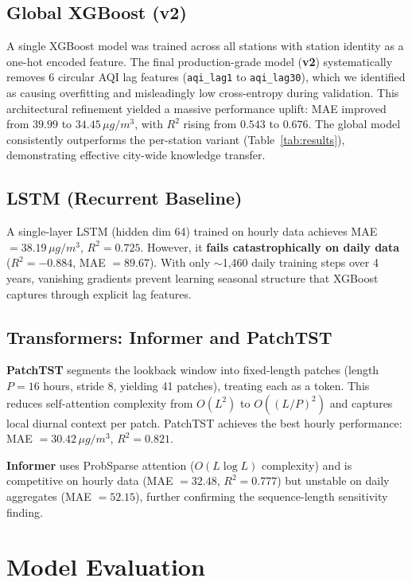 \documentclass[11pt,a4paper]{article}
\begin{document}
\subsection{Global XGBoost (v2)}
A single XGBoost model was trained across all stations with station identity as a one-hot encoded feature. The final production-grade model (\textbf{v2}) systematically removes 6 circular AQI lag features (\texttt{aqi\_lag1} to \texttt{aqi\_lag30}), which we identified as causing overfitting and misleadingly low cross-entropy during validation. This architectural refinement yielded a massive performance uplift: MAE improved from $39.99$ to $\mathbf{34.45}\,\mu g/m^3$, with $R^2$ rising from $0.543$ to $\mathbf{0.676}$. The global model consistently outperforms the per-station variant (Table~\ref{tab:results}), demonstrating effective city-wide knowledge transfer.

\subsection{LSTM (Recurrent Baseline)}
A single-layer LSTM (hidden dim 64) trained on hourly data achieves MAE $= 38.19\,\mu g/m^3$, $R^2 = 0.725$. However, it \textbf{fails catastrophically on daily data} ($R^2 = -0.884$, MAE $= 89.67$). With only $\sim$1,460 daily training steps over 4 years, vanishing gradients prevent learning seasonal structure that XGBoost captures through explicit lag features.

\subsection{Transformers: Informer and PatchTST}
\textbf{PatchTST} \cite{patchtst} segments the lookback window into fixed-length patches (length $P = 16$ hours, stride 8, yielding 41 patches), treating each as a token. This reduces self-attention complexity from $O(L^2)$ to $O((L/P)^2)$ and captures local diurnal context per patch. PatchTST achieves the best hourly performance: MAE $= 30.42\,\mu g/m^3$, $R^2 = 0.821$.

\textbf{Informer} \cite{informer} uses ProbSparse attention ($O(L\log L)$ complexity) and is competitive on hourly data (MAE $= 32.48$, $R^2 = 0.777$) but unstable on daily aggregates (MAE $= 52.15$), further confirming the sequence-length sensitivity finding.

\section{Model Evaluation}
\end{document}
